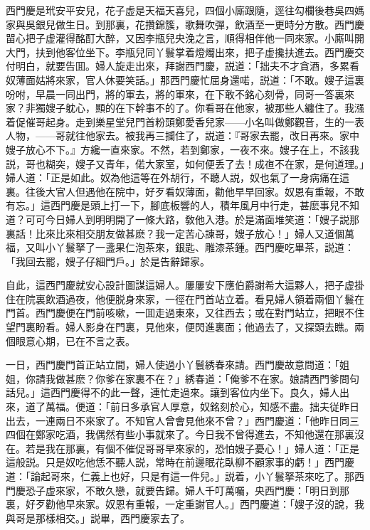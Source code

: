 西門慶是玳安平安兒，花子虚是天福天喜兒，四個小廝跟隨，逕往勾欄後巷吳四媽家與吳銀兒做生日。到那裏，花攢錦簇，歌舞吹彈，飲酒至一更時分方散。西門慶㽞心把子虚灌得酩酊大醉，又因李瓶兒央浼之言，順得相伴他一同來家。小廝叫開大門，扶到他客位坐下。李瓶兒同丫鬟掌着燈燭出來，把子虚攙扶進去。西門慶交付明白，就要告囬。婦人旋走出來，拜謝西門慶，説道：「拙夫不才貪酒，多累看奴薄面姑將來家，官人休要笑話。」那西門慶忙屈身還喏，説道：「不敢。嫂子這裏吩咐，早晨一同出門，將的軍去，將的軍來，在下敢不銘心刻骨，同哥一答裏來家？非獨嫂子躭心，顯的在下幹事不的了。你看哥在他家，被那些人纏住了。我漒着促催哥起身。走到樂星堂兒門首粉頭鄭愛香兒家——小名叫做鄭觀音，生的一表人物，——哥就往他家去。被我再三攔住了，説道：『哥家去罷，改日再來。家中嫂子放心不下。』方纔一直來家。不然，若到鄭家，一夜不來。嫂子在上，不該我説，哥也糊突，嫂子又青年，偌大家室，如何便丢了去！成亱不在家，是何道理。」婦人道：「正是如此。奴為他這等在外胡行，不聽人説，奴也氣了一身病痛在這裏。往後大官人但遇他在院中，好歹看奴薄面，勸他早早回家。奴恩有重報，不敢有忘。」這西門慶是頭上打一下，腳底板響的人，積年風月中行走，甚麽事兒不知道？可可今日婦人到明明開了一條大路，敎他入港。於是滿面堆笑道：「嫂子説那裏話！比來比來相交朋友做甚麽？我一定苦心諫哥，嫂子放心！」婦人又道個萬福，又叫小丫鬟拏了一盞果仁泡茶來，銀匙、雕漆茶鍾。西門慶吃畢茶，説道：「我回去罷，嫂子仔細門戶。」於是告辭歸家。

自此，這西門慶就安心設計圖謀這婦人。屢屢安下應伯爵謝希大這夥人，把子虚掛住在院裏飲酒過夜，他便脱身來家，一徑在門首站立着。看見婦人領着兩個丫鬟在門首。西門慶便在門前咳嗽，一囬走過東來，又往西去；或在對門站立，把眼不住望門裏盼看。婦人影身在門裏，見他來，便閃進裏面；他過去了，又探頭去瞧。兩個眼意心期，已在不言之表。

一日，西門慶門首正站立間，婦人使過小丫鬟綉春來請。西門慶故意問道：「姐姐，你請我做甚麽？你爹在家裏不在？」綉春道：「俺爹不在家。娘請西門爹問句話兒。」這西門慶得不的此一聲，連忙走過來。讓到客位内坐下。良久，婦人出來，道了萬福。便道：「前日多承官人厚意，奴銘刻於心，知感不盡。拙夫従昨日出去，一連兩日不來家了。不知官人曾會見他來不曾？」西門慶道：「他昨日同三四個在鄭家吃酒，我偶然有些小事就來了。今日我不曾得進去，不知他還在那裏沒在。若是我在那裏，有個不催促哥哥早來家的，恐怕嫂子憂心！」婦人道：「正是這般説。只是奴吃他恁不聽人説，常時在前邊眠花臥柳不顧家事的虧！」西門慶道：「論起哥來，仁義上也好，只是有這一件兒。」説着，小丫鬟拏茶來吃了。那西門慶恐子虚來家，不敢久戀，就要告歸。婦人千叮萬囑，央西門慶：「明日到那裏，好歹勸他早來家。奴恩有重報，一定重謝官人。」西門慶道：「嫂子沒的說，我與哥是那樣相交。」説畢，西門慶家去了。

